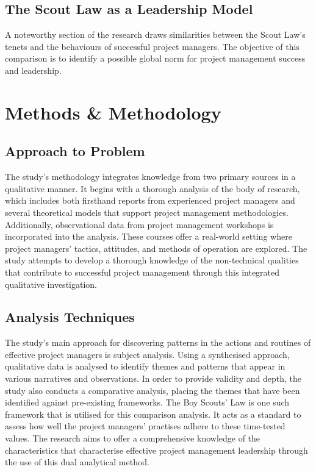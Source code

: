 \documentclass{article}
\begin{document}
\subsection{The Scout Law as a Leadership Model}
A noteworthy section of the research draws similarities between the Scout Law's tenets and the behaviours of successful project managers. The objective of this comparison is to identify a possible global norm for project management success and leadership.

\section{Methods \& Methodology}
\subsection{Approach to Problem}
The study's methodology integrates knowledge from two primary sources in a qualitative manner. It begins with a thorough analysis of the body of research, which includes both firsthand reports from experienced project managers and several theoretical models that support project management methodologies. Additionally, observational data from project management workshops is incorporated into the analysis. These courses offer a real-world setting where project managers' tactics, attitudes, and methods of operation are explored. The study attempts to develop a thorough knowledge of the non-technical qualities that contribute to successful project management through this integrated qualitative investigation.

\subsection{Analysis Techniques}
The study's main approach for discovering patterns in the actions and routines of effective project managers is subject analysis. Using a synthesised approach, qualitative data is analysed to identify themes and patterns that appear in various narratives and observations. In order to provide validity and depth, the study also conducts a comparative analysis, placing the themes that have been identified against pre-existing frameworks. The Boy Scouts' Law is one such framework that is utilised for this comparison analysis. It acts as a standard to assess how well the project managers' practises adhere to these time-tested values. The research aims to offer a comprehensive knowledge of the characteristics that characterise effective project management leadership through the use of this dual analytical method.
\end{document}
